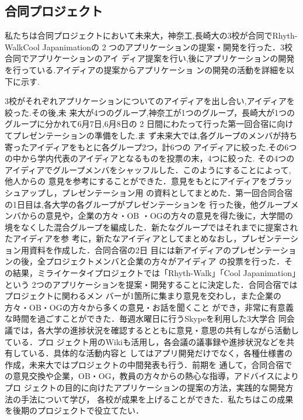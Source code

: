 \subsection{合同プロジェクト}

\par 私たちは合同プロジェクトにおいて未来大，神奈工,長崎大の3校が合同でRhyth-WalkCool
Japanimationの 2 つのアプリケーションの提案・開発を行った．3校合同でアプリケーションのアイ
ディア提案を行い,後にアプリケーションの開発を行っている.アイディアの提案からアプリケーショ
ンの開発の活動を詳細を以下に示す.
\par 3校がそれぞれアプリケーションについてのアイディアを出し合い,アイディアを絞った.その後,未
来大が4つのグループ,神奈工が1つのグループ，長崎大が1つのグループに分かれて6月7日,6月8日の 2 日間にわたって行った第一回合宿に向けてプレゼンテーションの準備をした.ま
ず未来大では,各グループのメンバが持ち寄ったアイディアをもとに各グループ2つ，計6つの
アイディアに絞った.その6つの中から学内代表のアイディアとなるものを投票の末，4つに絞った.
その4つのアイディアでグループメンバをシャッフルした．このようにすることによって,他人からの
意見を参考にすることができた．意見をもとにアイディアをブラッシュアップし，プレゼンテーション用
の資料としてまとめた．第一回合同合宿の1日目は,各大学の各グループがプレゼンテーションを
行った後，他グループメンバからの意見や，企業の方々・OB ・OGの方々の意見を得た後に，大学間の
境をなくした混合グループを編成した．新たなグループではそれまでに提案されたアイディアを参
考に，新たなアイディアとしてまとめなおし，プレゼンテーション用資料を作成した．合同合宿の2日
目には新アイディアのプレゼンテーションの後，全プロジェクトメンバと企業の方々がアイディア
の投票を行った．その結果，ミライケータイプロジェクトでは「Rhyth-Walk」「Cool Japanimation」という
2つのアプリケーションを提案・開発することに決定した．合同合宿ではプロジェクトに関わるメン
バーが1箇所に集まり意見を交わし，また企業の方々・OB・OGの方々から多くの意見・お話を聞くこと
ができ，非常に有意義な時間を過ごすことができた．毎週水曜日に行うSkypeを利用した3大学合
同会議では，各大学の進捗状況を確認するとともに意見・意思の共有しながら活動している．プロ
ジェクト用のWikiも活用し，各会議の議事録や進捗状況などを共有している．具体的な活動内容と
してはアプリ開発だけでなく，各種仕様書の作成，未来大ではプロジェクトの中間発表も行う．前期を
通して，合同合宿での意見交換や企業，OB・OG，教員の方々からの熱心な指導，アドバイスによりプロ
ジェクトの目的に向けたアプリケーションの提案の方法，実践的な開発方法の手法について学び，
各校が成果を上げることができた．私たちはこの成果を後期のプロジェクトで役立てたい．
